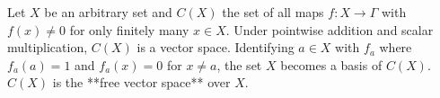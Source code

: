 Let $X$ be an arbitrary set and $C(X)$ the set of all maps $f: X \to \Gamma$ with $f(x) \neq 0$ for only finitely many $x \in X$. Under pointwise addition and scalar multiplication, $C(X)$ is a vector space. Identifying $a \in X$ with $f_a$ where $f_a(a) = 1$ and $f_a(x) = 0$ for $x \neq a$, the set $X$ becomes a basis of $C(X)$. $C(X)$ is the **free vector space** over $X$.
